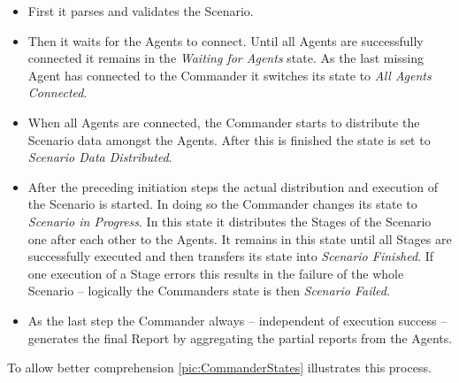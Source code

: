 \begin{itemize}
	\item First it parses and validates the Scenario.
	\item Then it waits for the Agents to connect.
	Until all Agents are successfully connected it remains in the \emph{Waiting for Agents} state.
	As the last missing Agent has connected to the Commander it switches its state to \emph{All Agents Connected}.
	\item When all Agents are connected, the Commander starts to distribute the Scenario data amongst the Agents. After this is finished the state is set to \emph{Scenario Data Distributed}.
	\item After the preceding initiation steps the actual distribution and execution of the Scenario is started.
	In doing so the Commander changes its state to \emph{Scenario in Progress}.
	In this state it distributes the Stages of the Scenario one after each other to the Agents.
	It remains in this state until all Stages are successfully executed and then transfers its state into \emph{Scenario Finished}.
	If one execution of a Stage errors this results in the failure of the whole Scenario -- logically the Commanders state is then \emph{Scenario Failed}.
	\item As the last step the Commander always -- independent of execution success -- generates the final Report by aggregating the partial reports from the Agents.
\end{itemize}

To allow better comprehension \figurename{} \ref{pic:CommanderStates} illustrates this process.

